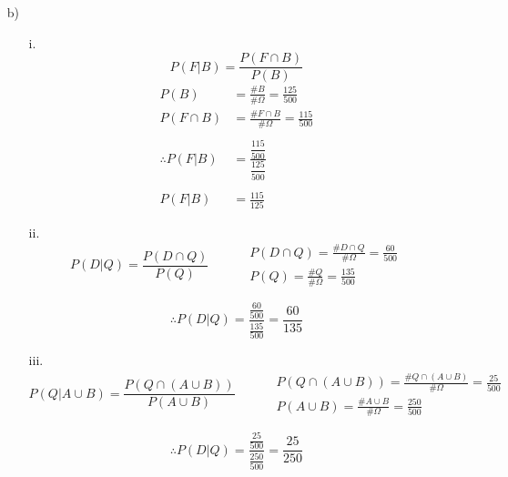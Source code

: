 \documentclass{report}
\begin{document}
{\begin{enumerate}
\begin{enumerate}
          donde
          \begin{align*}
            P(D^c) &= \frac{\# D^c}{\# \Omega} = \frac{375}{500} \\
            P(R \cap D^c) &= \frac{\# R \cap D^c}{\# \Omega} = \frac{50}{500}
          \end{align*}

          Sustituimos:
          \begin{align*}
            P(R|D^c) &= \frac{\dfrac{50}{500}}{\dfrac{375}{500}} \\
            P(R|D^c) &= \frac{50}{500}
          \end{align*}
      \end{enumerate}
    \item[b) ]
      \begin{enumerate}
      \item[i. ] \[P(F|B) = \frac{P(F \cap B) }{P(B)}\]
        \begin{align*}
          P(B) &= \frac{\# B}{\# \Omega} = \frac{125}{500} \\
          P(F \cap B) &= \frac{\# F \cap B}{\# \Omega} = \frac{115}{500} \\
          ~ \\
          \therefore P(F|B) &= \frac{\dfrac{115}{500}}{\dfrac{125}{500}} \\
          ~ \\
          P(F|B) &= \frac{115}{125}
        \end{align*}
        
      \item[ii. ] 
        \[
        P(D|Q) = \frac{P(D \cap Q)}{P(Q)}
        \qquad
        \begin{aligned}
          &P(D \cap Q) = \frac{\# D \cap Q}{\# \Omega} = \frac{60}{500} \\
          &P(Q) = \frac{\# Q}{\# \Omega} = \frac{135}{500}
        \end{aligned}
        \]
        
        \[\therefore P(D|Q) = \frac{\frac{60}{500}}{\frac{135}{500}} = \frac{60}{135}\]

      \item[iii. ] 
        \[
        P(Q|A \cup B) = \frac{P(Q \cap (A \cup B))}{P(A \cup B)}
        \qquad
        \begin{aligned}
          &P(Q \cap (A \cup B)) = \frac{\# Q \cap (A \cup B)}{\# \Omega} = \frac{25}{500} \\
          &P(A \cup B) = \frac{\# A \cup B}{\# \Omega} = \frac{250}{500}
        \end{aligned}
        \]
        
        \[\therefore P(D|Q) = \frac{\frac{25}{500}}{\frac{250}{500}} = \frac{25}{250}\]
      \end{enumerate}
  \end{enumerate}
}
\end{document}
